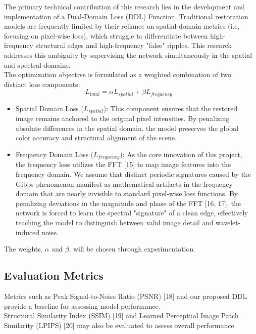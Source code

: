 \documentclass[12pt]{article}
\begin{document}
\quad The primary technical contribution of this research lies in the development and implementation of a Dual-Domain Loss (DDL) Function. Traditional restoration models are frequently limited by their reliance on spatial-domain metrics (i.e, focusing on pixel-wise loss), which struggle to differentiate between high-frequency structural edges and high-frequency "false" ripples. This research addresses this ambiguity by supervising the network simultaneously in the spatial and spectral domains. \\

The optimization objective is formulated as a weighted combination of two distinct loss components:
$$L_{total} = \alpha L_{spatial} + \beta L_{frequency}$$

\begin{itemize}
    \item Spatial Domain Loss ($L_{spatial}$): This component ensures that the restored image remains anchored to the original pixel intensities. By penalizing absolute differences in the spatial domain, the model preserves the global color accuracy and structural alignment of the scene.
    \item Frequency Domain Loss ($L_{frequency}$): As the core innovation of this project, the frequency loss utilizes the FFT [15] to map image features into the frequency domain. We assume that distinct periodic signatures caused by the Gibbs phenomenon manifest as mathematical artifacts in the frequency domain that are nearly invisible to standard pixel-wise loss functions. By penalizing deviations in the magnitude and phase of the FFT [16, 17], the network is forced to learn the spectral "signature" of a clean edge, effectively teaching the model to distinguish between valid image detail and wavelet-induced noise.
\end{itemize}

The weights, $\alpha$ and $\beta$, will be chosen through experimentation.

\subsection*{\small{Evaluation Metrics}}

\quad Metrics such as Peak Signal-to-Noise Ratio (PSNR) [18] and our proposed DDL provide a baseline for assessing model performance. \\

Structural Similarity Index (SSIM) [19] and Learned Perceptual Image Patch Similarity (LPIPS) [20] may also be evaluated to assess overall performance.
\end{document}
